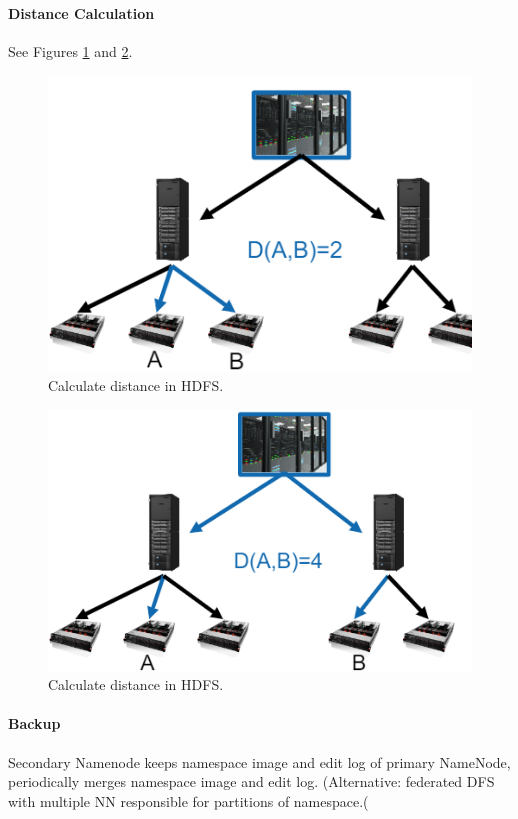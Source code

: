 
\paragraph{Distance Calculation}
See Figures \ref{fig:dist1} and \ref{fig:dist2}.

\begin{figure}[h]
	\centering
	\includegraphics[scale=0.6]{images/2-dist1.PNG}
	\caption{Calculate distance in HDFS.}
	\label{fig:dist1}
\end{figure}

\begin{figure}[h]
	\centering
	\includegraphics[scale=0.6]{images/2-dist2.PNG}
	\caption{Calculate distance in HDFS.}
	\label{fig:dist2}
\end{figure}

\paragraph{Backup}
Secondary Namenode keeps namespace image and edit log of primary NameNode, periodically merges namespace image and edit log. (Alternative: federated DFS with multiple NN responsible for partitions of namespace.(


